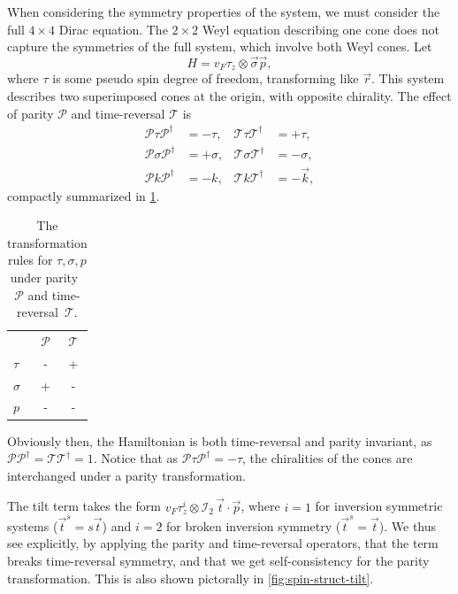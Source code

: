 When considering the symmetry properties of the system, we must consider the full \( 4\times 4 \) Dirac equation.
The \( 2\times 2 \) Weyl equation describing one cone does not capture the symmetries of the full system, which involve both Weyl cones.
Let
\[
  H = v_{F} \tau _{z} \otimes \vec{\sigma} \vec{p},
\]
where \(\tau \) is some pseudo spin degree of freedom, transforming like \(\vec{r}\).
This system describes two superimposed cones at the origin, with opposite chirality.
The effect of parity \(\mathcal{P}\) and time-reversal \(\mathcal{T}\) is
\begin{equation}
  \label{eq:135}
  \begin{aligned}
    \mathcal{P} \tau \mathcal{P}^{\dagger} &= -\tau, & \mathcal{T} \tau \mathcal{T}^{\dagger} &= +\tau,\\
    \mathcal{P} \sigma  \mathcal{P}^{\dagger} &= + \sigma,  & \mathcal{T} \sigma  \mathcal{T}^{\dagger} &= -\sigma, \\
    \mathcal{P} k \mathcal{P}^{\dagger} &= -k, & \mathcal{T} k \mathcal{T}^{\dagger} &= -\vec{k},
  \end{aligned}
\end{equation}
compactly summarized in \cref{tab:sign-transform}.
\begin{table}[h]
  \centering
  \caption{The transformation rules for \( \tau, \sigma, p \) under parity~\( \mathcal{P} \) and time-reversal~\( \mathcal{T} \).%
   \label{tab:sign-transform}}
  \begin{tabular}{lcc}
    \toprule
    & \(\mathcal{P}\) & \(\mathcal{T}\)\\
    \cmidrule{2-3}
    \(\tau \) & - & +\\
    \(\sigma \) & + & -\\
    \(p\) & - & -\\
    \bottomrule
  \end{tabular}
\end{table}
Obviously then, the Hamiltonian is both time-reversal and parity invariant, as \(\mathcal{P} \mathcal{P}^{\dagger} = \mathcal{T} \mathcal{T}^{\dagger} = 1\).
Notice that as \( \mathcal{P} \tau \mathcal{P}^{\dagger} = - \tau \), the chiralities of the cones are interchanged under a parity transformation.

The tilt term takes the form \(v_F \tau_z^i \otimes \mathcal{I}_{2} \, \vec{t} \cdot \vec{p} \), where \( i=1 \) for inversion symmetric systems (\( \vec{t}^s = s \vec{t} \)) and \( i=2 \) for broken inversion symmetry (\( \vec{t}^s = \vec{t} \)).
We thus see explicitly, by applying the parity and time-reversal operators, that the term breaks time-reversal symmetry, and that we get self-consistency for the parity transformation.
This is also shown pictorally in \cref{fig:spin-struct-tilt}.

